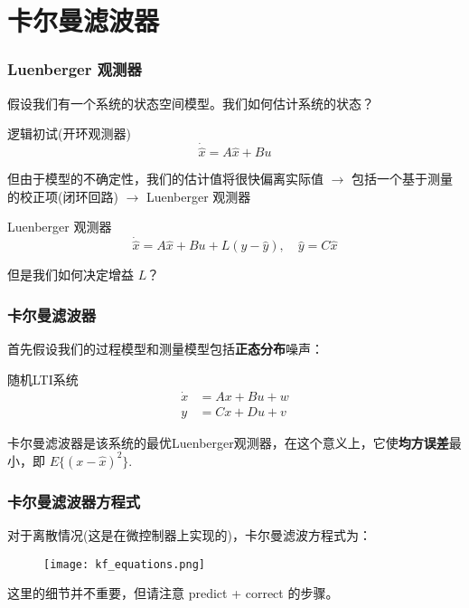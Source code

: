 \documentclass{beamer}
\begin{document}

\section{卡尔曼滤波器}

\begin{frame}
    \frametitle{Luenberger 观测器}
    假设我们有一个系统的状态空间模型。我们如何估计系统的状态？ 

    \begin{block}{逻辑初试(开环观测器)}
        \begin{equation}
            \dot{\hat{x}} = A \hat{x} + B u 
        \end{equation}
    \end{block}

    但由于模型的不确定性，我们的估计值将很快偏离实际值 $\rightarrow$ 包括一个基于测量的校正项(闭环回路) $\rightarrow$ Luenberger 观测器

    \begin{block}{Luenberger 观测器}
        \begin{equation}
            \dot{\hat{x}} = A \hat{x} + B u + L (y - \hat{y}), \quad \hat{y} = C \hat{x}
        \end{equation}
    \end{block}
    但是我们如何决定增益 $L$？
\end{frame}


\begin{frame}
    \frametitle{卡尔曼滤波器}
    首先假设我们的过程模型和测量模型包括\textbf{正态分布}噪声：
    \begin{block}{随机LTI系统}
        \begin{equation}
            \begin{aligned}
                \dot{x} &= A x + B u + w \\
                y &=C x + D u + v
            \end{aligned}
        \end{equation}
    \end{block}
    卡尔曼滤波器是该系统的最优Luenberger观测器，在这个意义上，它使\textbf{均方误差}最小，即 $E\{(x-\hat{x})^2\}$. 
\end{frame}


\begin{frame}
    \frametitle{卡尔曼滤波器方程式}
    对于离散情况(这是在微控制器上实现的)，卡尔曼滤波方程式为：
    \begin{figure}
        \texttt{[image: kf\_equations.png]}
    \end{figure}
    这里的细节并不重要，但请注意 predict + correct 的步骤。 
\end{frame}
\end{document}
